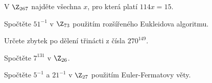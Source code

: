 \documentclass[11pt, a4paper]{article}
\begin{document}
\title{}
\author{Jakub Adamec\\B2M01TIK}

\maketitle

\begin{exercise}
V $\Z_{267}$ najděte všechna $x$, pro která platí $114x = 15$.
\end{exercise}
\begin{solution}
	
\end{solution}

\begin{exercise}
Spočtěte $51^{-1}$ v $\Z_{73}$ použitím rozšířeného Eukleidova algoritmu.
\end{exercise}
\begin{solution}
	
\end{solution}

\begin{exercise}
Určete zbytek po dělení třinácti z čísla $270^{149}$.
\end{exercise}
\begin{solution}
	
\end{solution}

\begin{exercise}
Spočtěte $7^{131}$ v $\Z_{26}$.
\end{exercise}
\begin{solution}
	
\end{solution}

\begin{exercise}
Spočtěte $5^{-1}$ a $21^{-1}$ v $\Z_{27}$ použitím Euler-Fermatovy věty.
\end{exercise}
\begin{solution}
	
\end{solution}
\end{document}
